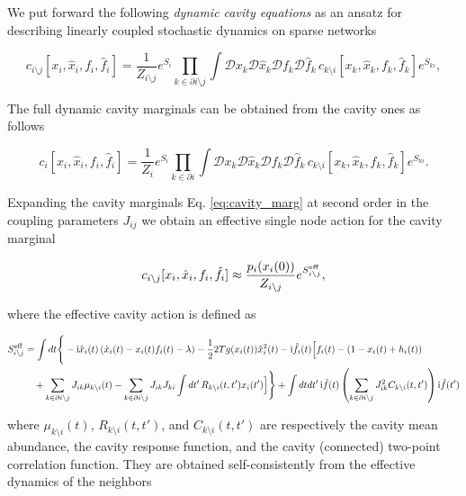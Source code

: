 \documentclass[
    preprint,
    linenumbers,
    amsmath,amssymb,amsfonts,
    aps, physrev,
    superscriptaddress,
    10pt,
    bibnotes
    ]{revtex4-2}
\begin{document}
We put forward the following \textit{dynamic cavity equations} as an ansatz for describing linearly coupled stochastic dynamics on sparse networks

\begin{equation}
  c_{i\setminus j}[x_{i},\hat{x}_{i}, f_i, \hat{f}_i] = \frac{1}{Z_{i\setminus j}}e^{S_i}\prod_{k\in\partial i \setminus j}\int{\mathcal{D}x_k\mathcal{D}\hat{x}_k\mathcal{D}f_k\mathcal{D}\hat{f}_k} \, c_{k\setminus i}[x_{k},\hat{x}_{k}, f_k, \hat{f}_k] e^{S_{ki}},\label{eq:cavity_marg}
\end{equation}

The full dynamic cavity marginals can be obtained from the cavity
ones as follows 

\begin{equation}
  c_{i}[x_{i},\hat{x}_{i}, f_i, \hat{f}_i]=\frac{1}{Z_{i}}e^{S_i}\prod_{k\in\partial i}\int{\mathcal{D}x_k\mathcal{D}\hat{x}_k\mathcal{D}f_k\mathcal{D}\hat{f}_k} \, c_{k\setminus i}[x_{k},\hat{x}_{k}, f_k, \hat{f}_k] e^{S_{ki}}.\label{eq:marg_RRG}
\end{equation}

Expanding the cavity marginals Eq. \eqref{eq:cavity_marg} at
second order in the coupling parameters $J_{ij}$ we obtain an effective single node action for the cavity marginal

\begin{equation}
  c_{i\setminus j}[x_{i},\hat{x}_{i}, f_i, \hat{f}_i] \approx \frac{p_i(x_i(0))}{Z_{i\setminus j}}e^{S^{\rm eff}_{i\setminus j}},
\end{equation}

where the effective cavity action is defined as

\begin{align}
  S^{\rm eff}_{i\setminus j} & = \int dt \Bigg\{-{\rm i}\hat{x}_i(t)\left(\dot{x}_i(t)-x_i(t)f_i(t)-\lambda\right)-\frac{1}{2}2Tg(x_i(t))\hat{x}_i^2(t)-{\rm i}\hat{f}_i(t)\Big[f_i(t)-\left(1-x_i(t)+h_i(t)\right) \nonumber \\
  & \quad  + \sum_{k\in\partial i \setminus j}J_{ik}\mu_{k\setminus i}(t)- \sum_{k\in\partial i \setminus j}J_{ik}J_{ki}\int dt' \, R_{k\setminus i}(t,t')x_i(t')\Big]\Bigg\}+\int dtdt' \, {\rm i}\hat{f}(t)\left(  \sum_{k\in\partial i \setminus j}J_{ik}^2 C_{k\setminus i}(t,t')\right){\rm i}\hat{f}(t')
\end{align}

where $\mu_{k\setminus i}(t)$, $R_{k\setminus i}(t,t')$, and $C_{k\setminus i}(t,t')$
are respectively the cavity mean abundance, the cavity response function, and the cavity (connected) two-point correlation function. They are obtained self-consistently from the effective dynamics of the neighbors
\end{document}
